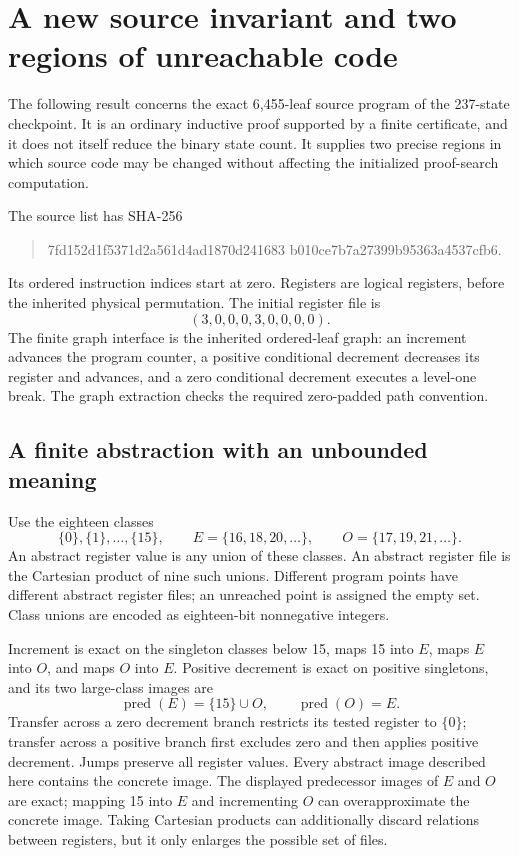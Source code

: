 \section{A new source invariant and two regions of unreachable code}
\label{sec:source-product-invariant}

The following result concerns the exact 6,455-leaf source program of the
237-state checkpoint. It is an ordinary inductive proof supported
by a finite certificate, and it does not itself reduce the binary state count.
It supplies two precise regions in which source code may be changed without
affecting the initialized proof-search computation.

The source list has SHA-256
\begin{quote}\small\ttfamily
7fd152d1f5371d2a561d4ad1870d241683\allowbreak
b010ce7b7a27399b95363a4537cfb6.
\end{quote}
Its ordered instruction indices start at zero.  Registers are logical
registers, before the inherited physical permutation.  The initial register
file is
\[
(3,0,0,0,3,0,0,0,0).
\]
The finite graph interface is the inherited ordered-leaf graph: an increment
advances the program counter, a positive conditional decrement decreases its
register and advances, and a zero conditional decrement executes a level-one
break.  The graph extraction checks the required zero-padded path convention.

\subsection{A finite abstraction with an unbounded meaning}

Use the eighteen classes
\[
\{0\},\{1\},\ldots,\{15\},\qquad
 E=\{16,18,20,\ldots\},\qquad
 O=\{17,19,21,\ldots\}.
\]
An abstract register value is any union of these classes.  An abstract register
file is the Cartesian product of nine such unions.  Different program points
have different abstract register files; an unreached point is assigned the
empty set.  Class unions are encoded as eighteen-bit nonnegative integers.

Increment is exact on the singleton classes below 15, maps 15 into $E$, maps
$E$ into $O$, and maps $O$ into $E$.  Positive decrement is exact on positive
singletons, and its two large-class images are
\[
\operatorname{pred}(E)=\{15\}\cup O,
\qquad
\operatorname{pred}(O)=E.
\]
Transfer across a zero decrement branch restricts its tested register to
$\{0\}$; transfer across a positive branch first excludes zero and then applies
positive decrement.  Jumps preserve all register values.  Every abstract image described here contains the concrete image.  The
displayed predecessor images of $E$ and $O$ are exact; mapping 15 into $E$
and incrementing $O$ can overapproximate the concrete image.  Taking Cartesian
products can additionally discard relations between registers, but it only
enlarges the possible set of files.

